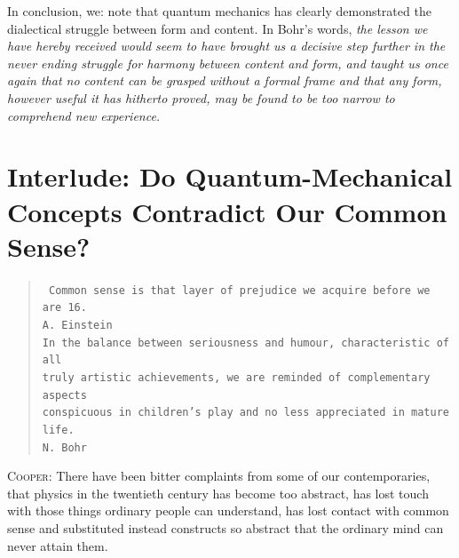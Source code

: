 \documentclass[a4paper,sfsidenotes,colorlinks=true]{tufte-book}
\numberwithin{equation}{section}
\numberwithin{figure}{section}
\begin{document}
In conclusion, we: note that quantum mechanics has clearly
demonstrated the dialectical struggle between form and content. In
Bohr's words, \emph{the lesson we have hereby received would seem to have
brought us a decisive step further in the never ending struggle for
harmony between content and form, and taught us once again that no
content can be grasped without a formal frame and that any form,
however useful it has hitherto proved, may be found to be too narrow
to comprehend new experience.}
\cleardoublepage

\section*{Interlude: Do Quantum-Mechanical Concepts Contradict Our
  Common Sense?}
\thispagestyle{empty}
\begin{fullwidth}
\begin{verse}
\texttt{\small
Common sense is that layer of prejudice we acquire before we are
16. \\
A. Einstein \\[8pt]
In the balance between seriousness and humour, characteristic of all
\\
truly artistic achievements, we are reminded of complementary aspects\\ conspicuous in children's play and no less appreciated in mature life.\\
N. Bohr}

\end{verse}
\end{fullwidth}
\vspace*{10pt}


\label{interlude-06}


\textsc{Cooper:} There have been bitter complaints from some of our
contemporaries, that physics in the twentieth century has become too
abstract, has lost touch with those things ordinary people can
understand, has lost contact with common sense and substituted instead
constructs so abstract that the ordinary mind can never attain them.
\end{document}
